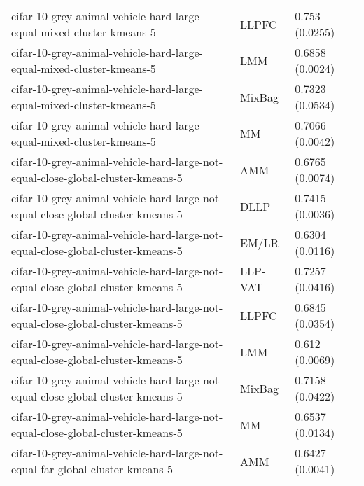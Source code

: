 \begin{longtable}{lll}
                                         cifar-10-grey-animal-vehicle-hard-large-equal-mixed-cluster-kmeans-5 &     LLPFC &                        0.753 (0.0255) \\
                                         cifar-10-grey-animal-vehicle-hard-large-equal-mixed-cluster-kmeans-5 &       LMM &                       0.6858 (0.0024) \\
                                         cifar-10-grey-animal-vehicle-hard-large-equal-mixed-cluster-kmeans-5 &    MixBag &                       0.7323 (0.0534) \\
                                         cifar-10-grey-animal-vehicle-hard-large-equal-mixed-cluster-kmeans-5 &        MM &                       0.7066 (0.0042) \\
                              cifar-10-grey-animal-vehicle-hard-large-not-equal-close-global-cluster-kmeans-5 &       AMM &                       0.6765 (0.0074) \\
                              cifar-10-grey-animal-vehicle-hard-large-not-equal-close-global-cluster-kmeans-5 &      DLLP &                       0.7415 (0.0036) \\
                              cifar-10-grey-animal-vehicle-hard-large-not-equal-close-global-cluster-kmeans-5 &     EM/LR &                       0.6304 (0.0116) \\
                              cifar-10-grey-animal-vehicle-hard-large-not-equal-close-global-cluster-kmeans-5 &   LLP-VAT &                       0.7257 (0.0416) \\
                              cifar-10-grey-animal-vehicle-hard-large-not-equal-close-global-cluster-kmeans-5 &     LLPFC &                       0.6845 (0.0354) \\
                              cifar-10-grey-animal-vehicle-hard-large-not-equal-close-global-cluster-kmeans-5 &       LMM &                        0.612 (0.0069) \\
                              cifar-10-grey-animal-vehicle-hard-large-not-equal-close-global-cluster-kmeans-5 &    MixBag &                       0.7158 (0.0422) \\
                              cifar-10-grey-animal-vehicle-hard-large-not-equal-close-global-cluster-kmeans-5 &        MM &                       0.6537 (0.0134) \\
                                cifar-10-grey-animal-vehicle-hard-large-not-equal-far-global-cluster-kmeans-5 &       AMM &                       0.6427 (0.0041) \\

\end{longtable}
